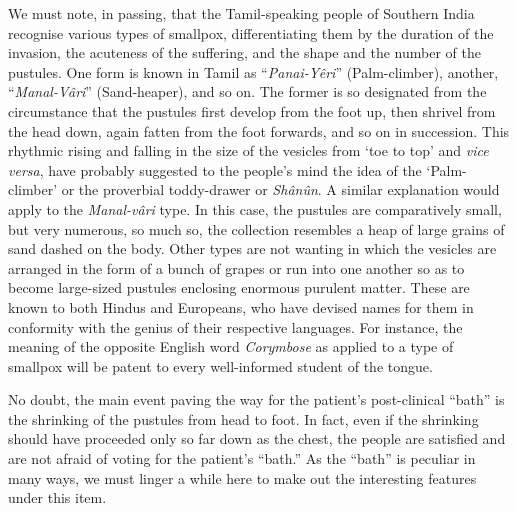 \documentclass[a4paper, 12pt, oneside, english, twocolumn]{article}
\begin{document}
We must note, in passing, that the Tamil-speaking people of Southern India recognise various types of smallpox, differentiating them by the duration of the invasion, the acuteness of the suffering, and the shape and the number of the pustules. One form is known in Tamil as ``\emph{Panai-Yêri}'' (Palm-climber), another, ``\emph{Manal-Vâri}'' (Sand-heaper), and so on. The former is so designated from the circumstance that the pustules first develop from the foot up, then shrivel from the head down, again fatten from the foot forwards, and so on in succession. This rhythmic rising and falling in the size of the vesicles from `toe to top' and \emph{vice versa}, have probably suggested to the people's mind the idea of the `Palm-climber' or the proverbial toddy-drawer or \emph{Shânûn}. A similar explanation would apply to the \emph{Manal-vâri} type. In this case, the pustules are comparatively small, but very numerous, so much so, the collection resembles a heap of large grains of sand dashed on the body. Other types are not wanting in which the vesicles are arranged in the form of a bunch of grapes or run into one another so as to become large-sized pustules enclosing enormous purulent matter. These are known to both Hindus and Europeans, who have devised names for them in conformity with the genius of their respective languages. For instance, the meaning of the opposite English word \emph{Corymbose} as applied to a type of smallpox will be patent to every well-informed student of the tongue.

No doubt, the main event paving the way for the patient's post-clinical ``bath'' is the shrinking of the pustules from head to foot. In fact, even if the shrinking should have proceeded only so far down as the chest, the people are satisfied and are not afraid of voting for the patient's ``bath.'' As the ``bath'' is peculiar in many ways, we must linger a while here to make out the interesting features under this item.
\end{document}
